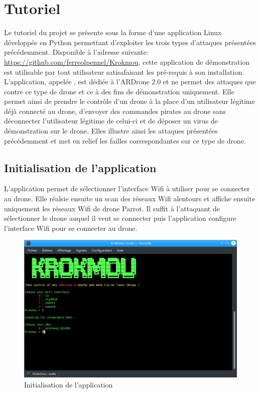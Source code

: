 \section{Tutoriel}
Le tutoriel du projet se présente sous la forme d'une application Linux développée en Python permettant d'exploiter les trois types d'attaques présentées précédemment. Disponible à l'adresse suivante: \url{https://github.com/ferreolpennel/Krokmou}, cette application de démonstration est utilisable par tout utilisateur satisafaisant les pré-requis à son installation. L'application, appelée , est dédiée à l'ARDrone 2.0 et ne permet des attaques que contre ce type de drone et ce à des fins de démonstration uniquement. Elle permet ainsi de prendre le contrôle d'un drone à la place d'un utilisateur légitime déjà connecté au drone, d'envoyer des commandes pirates au drone sans déconnecter l'utilisateur légitime de celui-ci et de déposer un virus de démonstration sur le drone. Elles illustre ainsi les attaques présentées précédemment et met en relief les failles correspondantes sur ce type de drone.

\subsection{Initialisation de l'application}
L'application permet de sélectionner l'interface Wifi à utiliser pour se connecter au drone. Elle réalsie ensuite un scan des réseaux Wifi alentours et affiche ensuite uniquement les réseaux Wifi de drone Parrot. Il suffit à l'attaquant de sélectionner le drone auquel il veut se connecter puis l'application configure l'interface Wifi pour se connecter au drone.

\begin{figure}[!ht]
  \centering
  \includegraphics[scale=0.3]{images/opening.png}
  \caption{Initialisation de l'application}
\end{figure}


